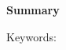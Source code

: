 \cleardoublepage
\newpage
\thispagestyle{empty}


\begin{center}\huge \textbf{Summary}\end{center}


%
%
%
%
%
%
%
%
%
%
%
%
%
%
%
%
%
%
%
%
%
%



\begin{flushleft}
\large

Keywords:
\end{flushleft}



